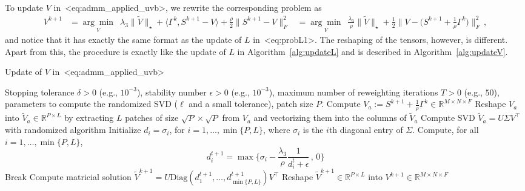 \documentclass[a4paper,11pt]{article}
\def\\{}%
\def\eqref#1{<#1>}%
\newcommand{\mypar}[1]{\bigskip\noindent {\bf #1.}}
\begin{document}
\mypar{Updating $\bm{V}$}
To update $V$ in~\eqref{eq:admm_applied_uvb}, we rewrite the corresponding
problem as
\begin{align*}
  V^{k+1}
  &=
  \underset{V}{\arg\min}\,\,\,
  \lambda_3 \big\|\widetilde{V}\big\|_{\star}
  +
  \langle\Gamma^k, S^{k+1} - V\rangle
  +
  \frac{\rho}{2}
  \|S^{k+1} - V\|_{F}^2
  \\
  &=
  \underset{V}{\arg\min}\,\,\,
  \frac{\lambda_3}{\rho} \big\|\widetilde{V}\big\|_{\star}
  +
  \frac{1}{2}
  \Big\|V - \big(S^{k+1} + \frac{1}{\rho}\Gamma^k\big)\Big\|_F^2\,,
\end{align*}
and notice that it has exactly the same format as the update of $L$
in~\eqref{eq:probL1}. The reshaping of the tensors, however, is different.
Apart from this, the procedure is exactly like the update of $L$ in
Algorithm~\ref{alg:updateL} and is described in Algorithm~\ref{alg:updateV}.
\begin{algorithm}
  \caption{Update of $V$ in~\eqref{eq:admm_applied_uvb}}
  \label{alg:updateV}
  \begin{algorithmic}[1]
  \algrenewcommand{}
  \Require Stopping tolerance $\delta > 0$ (e.g., $10^{-3}$), stability number $\epsilon > 0$ (e.g., $10^{-3}$), maximum number of
  reweighting iterations $T > 0$ (e.g., $50$), parameters to compute the
  randomized SVD ($\ell$ and a small tolerance), patch size $P$.
  \State Compute $V_a := S^{k+1} + \frac{1}{\rho}\Gamma^k \in \mathbb{R}^{M\times N\times F}$
  \State Reshape $V_a$ into $\widetilde{V}_a \in \mathbb{R}^{P \times L}$ by
  extracting $L$ patches of size $\sqrt{P} \times \sqrt{P}$ from $V_a$ and vectorizing
  them into the columns of $\widetilde{V}_a$
  \label{subAlg:updateVPatchExt}
  \State Compute SVD $\widetilde{V}_a = U \Sigma V^\top$ with randomized
  algorithm
  \State Initialize $d_i = \sigma_i$, for $i = 1, \ldots, \min\{P, L\}$, where
  $\sigma_i$ is the $i$th diagonal entry of $\Sigma$.
    \State Compute, for all $i = 1, \ldots, \min\{P, L\}$, 
    $$
    d_i^{t+1} = \max\Big\{\sigma_i - \frac{\lambda_3}{\rho}\frac{1}{d_i^t + \epsilon}\, ,\, 0\Big\}
    $$
      \State Break
    \EndIf
  \EndFor
  \State Compute matricial solution $\widetilde{V}^{k+1} = U
  \text{Diag}(d_1^{t+1}, \ldots, d_{\min\{P, L\}}^{t+1}) V^\top$
  \State Reshape $\widetilde{V}^{k+1} \in \mathbb{R}^{P \times L}$ into
  $V^{k+1} \in \mathbb{R}^{M\times N\times F}$
  \label{subAlg:updateVReshapeBack}
  \end{algorithmic}
\end{algorithm}
\end{document}
